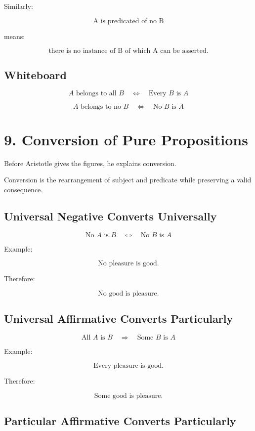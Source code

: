 \documentclass[12pt]{article}
\begin{document}
Similarly:

\[
\text{A is predicated of no B}
\]

means:

\[
\text{there is no instance of B of which A can be asserted.}
\]

\subsection*{Whiteboard}

\[
A \text{ belongs to all } B
\quad \Longleftrightarrow \quad
\text{Every } B \text{ is } A
\]

\[
A \text{ belongs to no } B
\quad \Longleftrightarrow \quad
\text{No } B \text{ is } A
\]

\section*{9. Conversion of Pure Propositions}

Before Aristotle gives the figures, he explains conversion.

Conversion is the rearrangement of subject and predicate while preserving a
valid consequence.

\subsection*{Universal Negative Converts Universally}

\[
\text{No } A \text{ is } B
\quad \Longleftrightarrow \quad
\text{No } B \text{ is } A
\]

Example:

\[
\text{No pleasure is good.}
\]

Therefore:

\[
\text{No good is pleasure.}
\]

\subsection*{Universal Affirmative Converts Particularly}

\[
\text{All } A \text{ is } B
\quad \Longrightarrow \quad
\text{Some } B \text{ is } A
\]

Example:

\[
\text{Every pleasure is good.}
\]

Therefore:

\[
\text{Some good is pleasure.}
\]

\subsection*{Particular Affirmative Converts Particularly}
\end{document}
